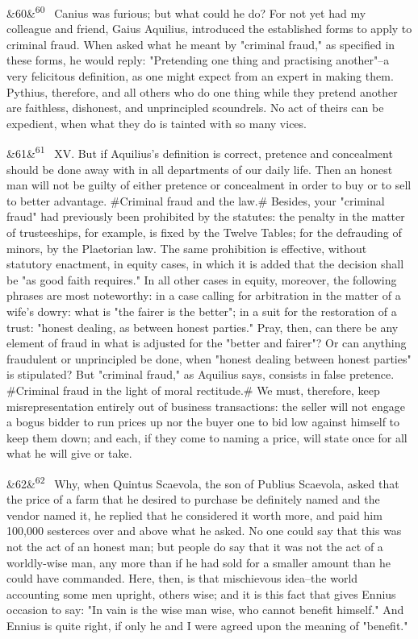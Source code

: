 \documentclass[12pt]{article}
\newcommand{\para}[1][]{\par\noindent\ifx&#1&\else\textsuperscript{\footnotesize #1}~\fi}
\begin{document}
\para[60] Canius was furious; but what could he do? For not yet had my colleague and friend, Gaius Aquilius, introduced the established forms to apply to criminal fraud. When asked what he meant by "criminal fraud," as specified in these forms, he would reply: "Pretending one thing and practising another"--a very felicitous definition, as one might expect from an expert in making them. Pythius, therefore, and all others who do one thing while they pretend another are faithless, dishonest, and unprincipled scoundrels. No act of theirs can be expedient, when what they do is tainted with so many vices.

\para[61] XV. But if Aquilius's definition is correct, pretence and concealment should be done away with in all departments of our daily life. Then an honest man will not be guilty of either pretence or concealment in order to buy or to sell to better advantage. \#Criminal fraud and the law.\# Besides, your "criminal fraud" had previously been prohibited by the statutes: the penalty in the matter of trusteeships, for example, is fixed by the Twelve Tables; for the defrauding of minors, by the Plaetorian law. The same prohibition is effective, without statutory enactment, in equity cases, in which it is added that the decision shall be "as good faith requires." In all other cases in equity, moreover, the following phrases are most noteworthy: in a case calling for arbitration in the matter of a wife's dowry: what is "the fairer is the better"; in a suit for the restoration of a trust: "honest dealing, as between honest parties." Pray, then, can there be any element of fraud in what is adjusted for the "better and fairer"? Or can anything fraudulent or unprincipled be done, when "honest dealing between honest parties" is stipulated? But "criminal fraud," as Aquilius says, consists in false pretence. \#Criminal fraud in the light of moral rectitude.\# We must, therefore, keep misrepresentation entirely out of business transactions: the seller will not engage a bogus bidder to run prices up nor the buyer one to bid low against himself to keep them down; and each, if they come to naming a price, will state once for all what he will give or take.

\para[62] Why, when Quintus Scaevola, the son of Publius Scaevola, asked that the price of a farm that he desired to purchase be definitely named and the vendor named it, he replied that he considered it worth more, and paid him 100,000 sesterces over and above what he asked. No one could say that this was not the act of an honest man; but people do say that it was not the act of a worldly-wise man, any more than if he had sold for a smaller amount than he could have commanded. Here, then, is that mischievous idea--the world accounting some men upright, others wise; and it is this fact that gives Ennius occasion to say: "In vain is the wise man wise, who cannot benefit himself." And Ennius is quite right, if only he and I were agreed upon the meaning of "benefit."
\end{document}
